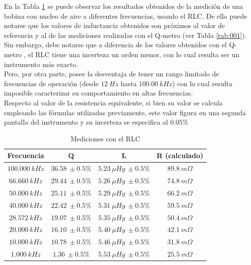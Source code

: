 \documentclass[a4paper,10pt]{article}
\begin{document}
		\indent En la Tabla \ref{tabRLCbobina} se puede observar los resultados 
		obtenidos de la medici\'on de una bobina con nucleo de aire a diferentes
		frecuencias, usando el RLC. De ella puede notarse que los valores de 
		inductancia obtenidos son pr\'oximos al valor de referencia y al de las 
		mediciones realizadas con el Q-metro (ver Tabla \ref{tab:001}). Sin 
		embargo, debe notarse que a diferencia de los valores obtenidos con el 
		Q-metro , el RLC tiene una incerteza un orden menor, con lo cual resulta
		ser un instrumento m\'as exacto. \\
		\indent Pero, por otra parte, posee la desventaja de tener un rango 
		limitado de frecuencias de operaci\'on (desde $12~Hz$ hasta 
		$100.00~kHz$) con lo cual resulta imposible caracterizar su 
		comportamiento en altas frecuencias. \\
		\indent Respecto al valor de la resistencia equivalente, si bien su 
		valor se calcula empleando las f\'ormulas utilizadas previamente, este 
		valor figura en una segunda pantalla del instrumento y su incerteza se 
		especifica al $0.05\%$
		\begin{table}[!htp]
			\centering
			\begin{tabular}{|c|c|c|c|}
				\hline
				Frecuencia & Q & L  & R (calculado) \\
				\hline
				$100.000~kHz$& $36.58~\pm0.5\%$ & $5.23~\mu Hy~\pm0.5\%$ &
				$ 89.8~m\Omega$ \\
				\hline
				$66.660~kHz$& $29.44~\pm0.5\%$ & $5.26~\mu Hy~\pm0.5\%$ &
				$ 74.8~m\Omega$ \\
				\hline
				$50.000~kHz$& $25.11~\pm0.5\%$ & $5.29~\mu Hy~\pm0.5\%$ &
				$ 66.2~m\Omega$ \\
				\hline  
				$40.000~kHz$& $22.42~\pm0.5\%$ & $5.31~\mu Hy~\pm0.5\%$ &
				$ 59.5~m\Omega$ \\
				\hline  										
				$28.572~kHz$& $19.07~\pm0.5\%$ & $5.35~\mu Hy~\pm0.5\%$ &
				$ 50.4~m\Omega$ \\
				\hline
				$20.000~kHz$& $16.10~\pm0.5\%$ & $5.40~\mu Hy~\pm0.5\%$ &
				$ 42.1~m\Omega$ \\
				\hline  
				$10.000~kHz$& $10.78~\pm0.5\%$ & $5.46~\mu Hy~\pm0.5\%$ &
				$ 31.8~m\Omega$ \\
				\hline 										
				$1.000~kHz$& $1.36~\pm0.5\%$ & $5.53~\mu Hy~\pm0.5\%$ &
				$ 25.5~m\Omega$ \\
				\hline 	  
			\end{tabular}
			\caption{Mediciones con el RLC} \label{tabRLCbobina}
		\end{table}
				
\end{document}
